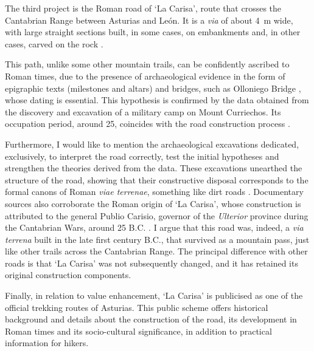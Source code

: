 The third project is the Roman road of ‘La Carisa’, route that crosses the Cantabrian Range between Asturias and León. It is a \textit{via} of about \SI{4}{\meter} wide, with large straight sections built, in some cases, on embankments and, in other cases, carved on the rock \parencites[383]{Camino_2010}[181]{González_2011}. 

This path, unlike some other mountain trails, can be confidently ascribed to Roman times, due to the presence of archaeological evidence in the form of epigraphic texts (milestones and altars) and bridges, such as Olloniego Bridge \parencite[179--180]{González_2011}, whose dating is essential. This hypothesis is confirmed by the data obtained from the discovery and excavation of a military camp on Mount Curriechos. Its occupation period, around 25\BC, coincides with the road construction process \parencites[376--377]{Camino_2010}[180]{González_2011}.

Furthermore, I would like to mention the archaeological excavations dedicated, exclusively, to interpret the road correctly, test the initial hypotheses and strengthen the theories derived from the data. These excavations unearthed the structure of the road, showing that their constructive disposal corresponds to the formal canons of Roman \textit{viae terrenae}, something like dirt roads \parencite[180]{González_2011}. Documentary sources also corroborate the Roman origin of ‘La Carisa’, whose construction is attributed to the general Publio Carisio, governor of the \textit{Ulterior} province during the Cantabrian Wars, around 25 B.C. \parencite[377]{Camino_2010}. I argue that this road was, indeed, a \textit{via terrena} built in the late first century B.C., that survived as a mountain pass, just like other trails across the Cantabrian Range. The principal difference with other roads is that ‘La Carisa’ was not subsequently changed, and it has retained its original construction components.

Finally, in relation to value enhancement, ‘La Carisa’ is publicised as one of the official trekking routes of Asturias. This public scheme offers historical background and details about the construction of the road, its development in Roman times and its socio-cultural significance, in addition to practical information for hikers.


